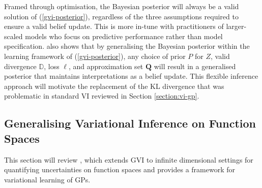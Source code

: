 \documentclass{article}
\numberwithin{equation}{section}
\begin{document}
Framed through optimisation, the Bayesian posterior will always be a valid solution of (\ref{gvi-posterior}), regardless of the three  assumptions required to ensure a valid belief update.
This is more in-tune with practitioners of larger-scaled models who focus on predictive performance rather than model specification.
\cite{knoblauch2022optimization} also shows that by generalising the Bayesian posterior within the learning framework of (\ref{gvi-posterior}), any choice of prior $P$ for $Z$, valid divergence $\mathbb{D}$, loss $\ell$, and approximation set $\boldsymbol{Q}$ will result in a generalised posterior that maintains interpretations as a belief update.
This flexible inference approach will motivate the replacement of the KL divergence that was problematic in standard VI reviewed in Section \ref{section:vi-gp}.

\subsection{Generalising Variational Inference on Function Spaces}
This section will review \cite{wild2022generalized}, which extends GVI to infinite dimensional settings for quantifying uncertainties on function spaces and provides a framework for variational learning of GPs.
\end{document}
